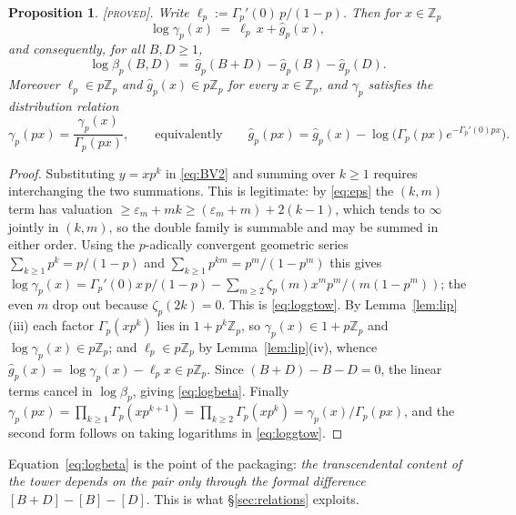 \documentclass[11pt,reqno]{article}
\newcommand{\Zp}{\mathbb{Z}_p}
\newcommand{\Gp}{\Gamma_p}
\newcommand{\gtow}{\gamma_p}
\newcommand{\gh}{\widehat{g}_p}
\newcommand{\bet}{\beta_p}
\newcommand{\PROVED}{{\normalfont\textsc{[proved]}}}
\theoremstyle{plain}
\newtheorem{proposition}[theorem]{Proposition}
\theoremstyle{definition}
\theoremstyle{remark}
\numberwithin{equation}{section}
\begin{document}
\begin{proposition}\label{prop:gtow}
\PROVED.  Write $\ell_p:=\Gp'(0)\,p/(1-p)$.  Then for $x\in\Zp$
\begin{equation}\label{eq:loggtow}
  \log\gtow(x)\ =\ \ell_p\,x+\gh(x),
\end{equation}
and consequently, for all $B,D\ge1$,
\begin{equation}\label{eq:logbeta}
  \log\bet(B,D)\ =\ \gh(B+D)-\gh(B)-\gh(D).
\end{equation}
Moreover $\ell_p\in p\Zp$ and $\gh(x)\in p\Zp$ for every $x\in\Zp$, and $\gtow$
satisfies the \emph{distribution relation}
\begin{equation}\label{eq:distrib}
  \gtow(px)=\frac{\gtow(x)}{\Gp(px)},
  \qquad\text{equivalently}\qquad
  \gh(px)=\gh(x)-\log\bigl(\Gp(px)e^{-\Gp'(0)px}\bigr).
\end{equation}
\end{proposition}

\begin{proof}
Substituting $y=xp^k$ in \eqref{eq:BV2} and summing over $k\ge1$ requires
interchanging the two summations.  This is legitimate: by \eqref{eq:eps} the
$(k,m)$ term has valuation
$\ge\varepsilon_m+mk\ge(\varepsilon_m+m)+2(k-1)$, which tends to $\infty$
jointly in $(k,m)$, so the double family is summable and may be summed in either
order.  Using the $p$-adically convergent geometric series
$\sum_{k\ge1}p^{k}=p/(1-p)$ and $\sum_{k\ge1}p^{km}=p^m/(1-p^m)$ this gives
$\log\gtow(x)=\Gp'(0)x\,p/(1-p)-\sum_{m\ge2}\zeta_p(m)x^mp^m/(m(1-p^m))$;
the even $m$ drop out because $\zeta_p(2k)=0$.  This is \eqref{eq:loggtow}.
By Lemma~\ref{lem:lip}(iii) each factor $\Gp(xp^k)$ lies in $1+p^k\Zp$, so
$\gtow(x)\in1+p\Zp$ and $\log\gtow(x)\in p\Zp$; and $\ell_p\in p\Zp$ by
Lemma~\ref{lem:lip}(iv), whence $\gh(x)=\log\gtow(x)-\ell_px\in p\Zp$.
Since $(B+D)-B-D=0$, the linear terms cancel in $\log\bet$, giving
\eqref{eq:logbeta}.  Finally $\gtow(px)=\prod_{k\ge1}\Gp(xp^{k+1})
=\prod_{k\ge2}\Gp(xp^k)=\gtow(x)/\Gp(px)$, and the second form follows on taking
logarithms in \eqref{eq:loggtow}.
\end{proof}

Equation~\eqref{eq:logbeta} is the point of the packaging: \emph{the
transcendental content of the tower depends on the pair only through the formal
difference $[B+D]-[B]-[D]$}.  This is what \S\ref{sec:relations} exploits.
\end{document}
